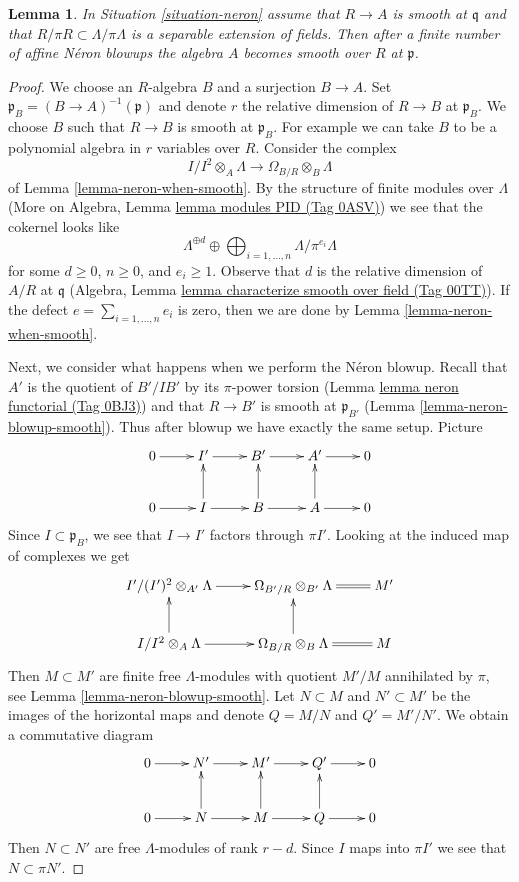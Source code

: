 \documentclass{amsart}
\theoremstyle{plain}
\newtheorem{lemma}[subsection]{Lemma}
\theoremstyle{definition}
\theoremstyle{remark}
\numberwithin{equation}{subsection}
\begin{document}
\begin{lemma}
\label{lemma-neron-desingularization}
In Situation \ref{situation-neron}
assume that $R \to A$ is smooth at $\mathfrak q$
and that $R/\pi R \subset \Lambda/\pi \Lambda$ is a separable
extension of fields. Then after a finite number of affine N\'eron
blowups the algebra $A$ becomes smooth over $R$ at $\mathfrak p$.
\end{lemma}

\begin{proof}
We choose an $R$-algebra $B$ and a surjection $B \to A$. Set
$\mathfrak p_B = (B \to A)^{-1}(\mathfrak p)$ and denote $r$
the relative dimension of $R \to B$ at $\mathfrak p_B$. We choose $B$
such that $R \to B$ is smooth at $\mathfrak p_B$.
For example we can take $B$ to be a polynomial algebra in $r$ variables
over $R$. Consider the complex
$$
I/I^2 \otimes_A \Lambda \longrightarrow \Omega_{B/R} \otimes_B \Lambda
$$
of Lemma \ref{lemma-neron-when-smooth}. By the structure of finite modules
over $\Lambda$ (More on Algebra, Lemma \href{https://stacks.math.columbia.edu/tag/0ASV}{lemma modules PID (Tag 0ASV)})
we see that the cokernel looks like
$$
\Lambda^{\oplus d} \oplus
\bigoplus\nolimits_{i = 1, \ldots, n} \Lambda/\pi^{e_i} \Lambda
$$
for some $d \geq 0$, $n \geq 0$, and $e_i \geq 1$. Observe that $d$
is the relative dimension of $A/R$ at $\mathfrak q$
(Algebra, Lemma \href{https://stacks.math.columbia.edu/tag/00TT}{lemma characterize smooth over field (Tag 00TT)}).
If the defect $e = \sum_{i = 1, \ldots, n} e_i$ is zero, then we are done by
Lemma \ref{lemma-neron-when-smooth}.

\medskip\noindent
Next, we consider what happens when we perform the N\'eron blowup.
Recall that $A'$ is the quotient of $B'/IB'$ by its $\pi$-power
torsion (Lemma \href{https://stacks.math.columbia.edu/tag/0BJ3}{lemma neron functorial (Tag 0BJ3)}) and that $R \to B'$ is smooth at
$\mathfrak p_{B'}$ (Lemma \ref{lemma-neron-blowup-smooth}).
Thus after blowup we have exactly the same setup. Picture
$$
\xymatrix{
0 \ar[r] & I' \ar[r] & B' \ar[r] & A' \ar[r] & 0 \\
0 \ar[r] & I \ar[u] \ar[r] & B \ar[u] \ar[r] & A \ar[r] \ar[u] & 0
}
$$
Since $I \subset \mathfrak p_B$, we see that $I \to I'$
factors through $\pi I'$. Looking at the induced map of
complexes we get
$$
\xymatrix{
I'/(I')^2 \otimes_{A'} \Lambda \ar[r] &
\Omega_{B'/R} \otimes_{B'} \Lambda \ar@{=}[r] & M' \\
I/I^2 \otimes_A \Lambda \ar[r] \ar[u] &
\Omega_{B/R} \otimes_B \Lambda \ar[u] \ar@{=}[r] & M
}
$$
Then $M \subset M'$ are finite free $\Lambda$-modules with quotient
$M'/M$ annihilated by $\pi$, see Lemma \ref{lemma-neron-blowup-smooth}.
Let $N \subset M$ and $N' \subset M'$ be the images of the horizontal
maps and denote $Q = M/N$ and $Q' = M'/N'$.
We obtain a commutative diagram
$$
\xymatrix{
0 \ar[r] &
N' \ar[r] &
M' \ar[r] &
Q' \ar[r] &
0 \\
0 \ar[r] &
N \ar[r] \ar[u] &
M \ar[r] \ar[u] &
Q \ar[r] \ar[u] &
0
}
$$
Then $N \subset N'$ are free $\Lambda$-modules of rank $r - d$.
Since $I$ maps into $\pi I'$ we see that $N \subset \pi N'$.


\end{proof}
\end{document}
